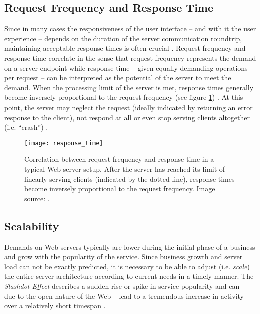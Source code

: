 \subsection{Request Frequency and Response Time}
\label{lab:frequency}
Since in many cases the responsiveness of the user interface -- and with it the user experience -- depends on the duration of the server communication roundtrip, maintaining acceptable response times is often crucial \cite[p. 1]{Nadimpalli2000}. Request frequency and response time correlate in the sense that request frequency represents the demand on a server endpoint while response time -- given equally demanding operations per request -- can be interpreted as the potential of the server to meet the demand. When the processing limit of the server is met, response times generally become inversely proportional to the request frequency (see figure \ref{fig:response_time}) \cite{response_time}. At this point, the server may neglect the request (ideally indicated by returning an error response to the client), not respond at all or even stop serving clients altogether (i.e. ``crash'') \cite{http}.

\begin{figure}
\centering\small
\setlength{\tabcolsep}{0mm}
  \texttt{[image: response\_time]}
\caption{
Correlation between request frequency and response time in a typical Web server setup. After the server has reached its limit of linearly serving clients (indicated by the dotted line), response times become inversely proportional to the request frequency. Image source: \cite{response_time}.
}
\label{fig:response_time}
\end{figure}

\subsection{Scalability}
\label{lab:scalabilty}
Demands on Web servers typically are lower during the initial phase of a business and grow with the popularity of the service. Since business growth and server load can not be exactly predicted, it is necessary to be able to adjust (i.e. \textit{scale}) the entire server architecture according to current needs in a timely manner. The \textit{Slashdot Effect} describes a sudden rise or spike in service popularity and can -- due to the open nature of the Web -- lead to a tremendous increase in activity over a relatively short timespan \cite[p. 1]{Drolia2010}. 

